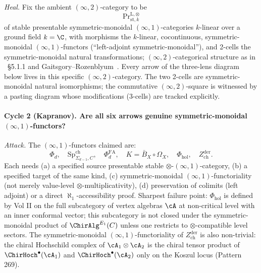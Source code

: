 \emph{Heal.} Fix the ambient $(\infty,2)$-category to be
\[
 \mathrm{Pr}^{\mathrm{L},\otimes}_{\mathrm{st}, k}
\]
of stable presentable symmetric-monoidal $(\infty,1)$-categories
$k$-linear over a ground field $k = \C$, with morphisms the
$k$-linear, cocontinuous, symmetric-monoidal $(\infty,1)$-functors
(``left-adjoint symmetric-monoidal''), and 2-cells the symmetric-monoidal
natural transformations; $(\infty,2)$-categorical structure as in
\cite{LurieHA}~\S 5.1.1 and Gaitsgory--Rozenblyum~\cite[Vol.~I,
Ch.~1]{GaitsgoryRozenblyum2019}. Every arrow of the three-lens diagram
below lives in this specific $(\infty,2)$-category. The two 2-cells are
symmetric-monoidal natural isomorphisms; the commutative $(\infty,2)$-square
is witnessed by a pasting diagram whose modifications (3-cells) are
tracked explicitly.

\paragraph*{Cycle 2 (Kapranov). Are all six arrows genuine
symmetric-monoidal $(\infty,1)$-functors?}

\emph{Attack.} The $(\infty,1)$-functors claimed are:
\[
 \Phi_d, \quad \mathrm{Sp}^{\mathrm{ch}}_{\Sigma_{d-1},C}, \quad
 \Phi^{\mathrm{FA}}_d, \quad K = \bar B_X \circ \Omega_X, \quad
 \Phi_{\mathrm{hol}}, \quad Z^{\mathrm{der}}_{\mathrm{ch}}.
\]
Each needs (a) a specified source presentable stable
$\otimes$-$(\infty,1)$-category, (b) a specified target of the same kind,
(c) symmetric-monoidal $(\infty,1)$-functoriality (not merely value-level
$\otimes$-multiplicativity), (d) preservation of colimits (left adjoint)
or a direct $\aleph_1$-accessibility proof. Sharpest failure point:
$\Phi_{\mathrm{hol}}$ is defined by Vol II on the full subcategory of
vertex algebras $\cA$ at non-critical level with an inner conformal
vector; this subcategory is not closed under the symmetric-monoidal
product of $\ChirAlg^{E_1}(C)$ unless one restricts to
$\otimes$-compatible level sectors. The symmetric-monoidal
$(\infty,1)$-functoriality of $Z^{\mathrm{der}}_{\mathrm{ch}}$ is also
non-trivial: the chiral Hochschild complex of $\cA_1 \otimes \cA_2$ is
the chiral tensor product of $\ChirHoch^\bullet(\cA_1)$ and
$\ChirHoch^\bullet(\cA_2)$ only on the Koszul locus (Pattern 269).

